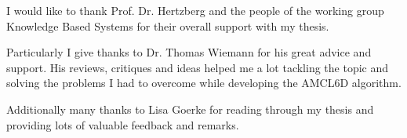 \documentclass[Thesis.tex]{subfiles}
\begin{document}
I would like to thank Prof. Dr. Hertzberg and the people of the working group Knowledge Based Systems for their overall support with my thesis.

Particularly I give thanks to Dr. Thomas Wiemann for his great advice and support. His reviews, critiques and ideas helped me a lot tackling the topic and solving the problems I had to overcome while developing the AMCL6D algorithm.

\bigskip

Additionally many thanks to Lisa Goerke for reading through my thesis and providing lots of valuable feedback and remarks.
\end{document}
